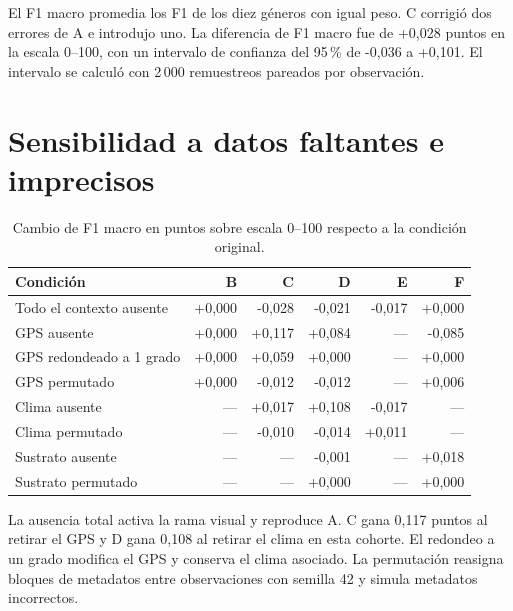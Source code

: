 \documentclass[11pt,a4paper]{article}
\begin{document}
\clearpage
El F1 macro promedia los F1 de los diez géneros con igual peso. C corrigió dos
errores de A e introdujo uno. La diferencia de F1 macro fue de
+0,028 puntos en la escala 0--100, con un intervalo de confianza del
95\,\% de -0,036 a +0,101. El intervalo se calculó con 2\,000 remuestreos pareados
por observación.

\section{Sensibilidad a datos faltantes e imprecisos}
\begin{table}[H]
\centering
\caption{Cambio de F1 macro en puntos sobre escala 0--100 respecto a la condición original.}
\label{tab:sens}
\begin{tabular}{lrrrrr}
\toprule
Condición & B & C & D & E & F \\
\midrule
Todo el contexto ausente & +0,000 & -0,028 & -0,021 & -0,017 & +0,000 \\
GPS ausente & +0,000 & +0,117 & +0,084 & --- & -0,085 \\
GPS redondeado a 1 grado & +0,000 & +0,059 & +0,000 & --- & +0,000 \\
GPS permutado & +0,000 & -0,012 & -0,012 & --- & +0,006 \\
Clima ausente & --- & +0,017 & +0,108 & -0,017 & --- \\
Clima permutado & --- & -0,010 & -0,014 & +0,011 & --- \\
Sustrato ausente & --- & --- & -0,001 & --- & +0,018 \\
Sustrato permutado & --- & --- & +0,000 & --- & +0,000 \\
\bottomrule
\end{tabular}
\par{}
\end{table}

La ausencia total activa la rama visual y reproduce A. C gana 0,117 puntos al
retirar el GPS y D gana 0,108 al retirar el clima en esta cohorte. El redondeo
a un grado modifica el GPS y conserva el clima asociado. La permutación
reasigna bloques de metadatos entre observaciones con semilla 42 y simula
metadatos incorrectos.
\end{document}
